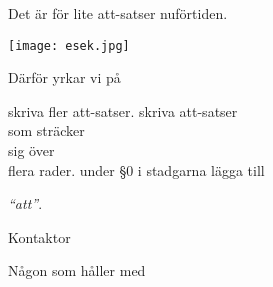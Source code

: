 \documentclass[../_main/handlingar.tex]{subfiles}
\begin{document}

Det är för lite att-satser nuförtiden.

\begin{center}
    \texttt{[image: esek.jpg]}
\end{center}

Därför yrkar vi på
\begin{attsatser}
    \att skriva fler att-satser.
    \att
    skriva att-satser\\
    som sträcker\\
    sig över\\
    flera rader.
    \att under \S0 i stadgarna lägga till\par
    \emph{``att''}.
\end{attsatser}

\begin{signatures}{2}
    \mvh
    \signature{Erik Månsson}{Kontaktor}
    \signature{Måns Eriksson}{Någon som håller med}
\end{signatures}
\end{document}
